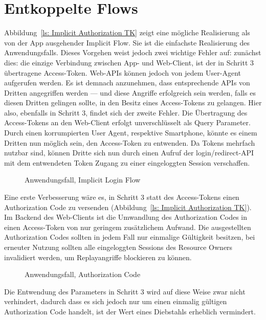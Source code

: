 \section{Entkoppelte Flows}
Abbildung~\ref{ls: Implicit Authorization TK} zeigt eine mögliche Realisierung
als von der App ausgehender Implicit Flow. Sie ist die einfachste Realisierung
des Anwendungsfalls. Dieses Vorgehen weist jedoch zwei wichtige Fehler auf:
zunächst dies: die einzige Verbindung zwischen App- und Web-Client, ist der in
Schritt 3 übertragene Access-Token. Web-APIs können jedoch von jedem User-Agent
aufgerufen werden. Es ist demnach anzunehmen, dass entsprechende APIs von
Dritten angegriffen werden --- und diese Angriffe erfolgreich sein werden, falls
es diesen Dritten gelingen sollte, in den Besitz eines Access-Tokens zu
gelangen. Hier also, ebenfalls in Schritt 3, findet sich der zweite Fehler. Die
Übertragung des Access-Tokens an den Web-Client erfolgt unverschlüsselt als
Query Parameter. Durch einen korrumpierten User Agent, respektive Smartphone,
könnte es einem Dritten nun möglich sein, den Access-Token zu entwenden. Da
Tokens mehrfach nutzbar sind, können Dritte sich nun durch einen Aufruf der
login/redirect-API mit dem entwendeten Token Zugang zu einer eingeloggten
Session verschaffen.
\begin{figure}[h]
    \scalebox{.5}{
        
    }
    \caption{Anwendungsfall, Implicit Login Flow}\label{ls: Implicit Authorization
    TK}
\end{figure} \noindent
Eine erste Verbesserung wäre es, in Schritt 3 statt des Access-Tokens einen
Authorization Code zu versenden (Abbildung~\ref{ls: Implicit Authorization TK}).
Im Backend des Web-Clients ist die Umwandlung des Authorization Codes in einen
Access-Token von nur geringem zusätzlichem Aufwand. Die ausgestellten
Authorization Codes sollten in jedem Fall nur einmalige Gültigkeit besitzen, bei
erneuter Nutzung sollten alle eingeloggten Sessions des Resource Owners
invalidiert werden, um Replayangriffe blockieren zu können.
\begin{figure}[h]
    \scalebox{.5}{
        
    }
    \caption{Anwendungsfall, Authorization Code}\label{ls: Authorization Code TK}
\end{figure} \noindent
Die Entwendung des Parameters in Schritt 3 wird auf diese Weise zwar nicht
verhindert, dadurch dass es sich jedoch nur um einen einmalig gültigen
Authorization Code handelt, ist der Wert eines Diebstahls erheblich vermindert.
